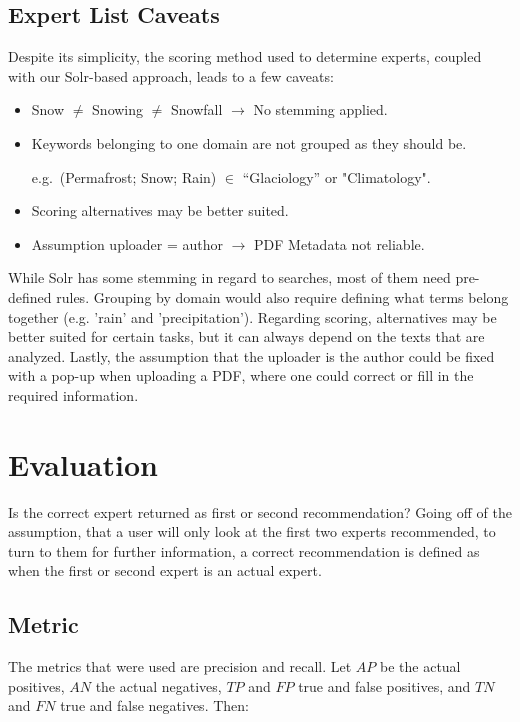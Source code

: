 \documentclass[a4paper,12pt]{article}
\begin{document}
\subsection{Expert List Caveats}
Despite its simplicity, the scoring method used to determine experts, coupled with our Solr-based approach, leads to a few caveats:
\begin{itemize}
    \item Snow $\neq$ Snowing $\neq$ Snowfall $\rightarrow$ No stemming applied.
    \item Keywords belonging to one domain are not grouped as they should be. 
        
        e.g.\ (Permafrost; Snow; Rain) $\in$ “Glaciology” or "Climatology".
    
    \item Scoring alternatives may be better suited.
    \item Assumption uploader = author $\rightarrow$ PDF Metadata not reliable.
\end{itemize}

While Solr has some stemming in regard to searches, most of them need pre-defined rules.
Grouping by domain would also require defining what terms belong together (e.g. 'rain' and 'precipitation').
Regarding scoring, alternatives may be better suited for certain tasks, but it can always depend on the texts that are analyzed.
Lastly, the assumption that the uploader is the author could be fixed with a pop-up when uploading a PDF, where one could correct or fill in the required information. 

\section{Evaluation} %
Is the correct expert returned as first or second recommendation?
Going off of the assumption, that a user will only look at the first two experts recommended, to turn to them for further information, a correct recommendation is defined as when the first or second expert is an actual expert.

\subsection{Metric}
The metrics that were used are precision and recall. 
Let $AP$ be the actual positives, $AN$ the actual negatives, $TP$ and $FP$ true
and false positives, and $TN$ and $FN$ true and false negatives. Then:
\end{document}
